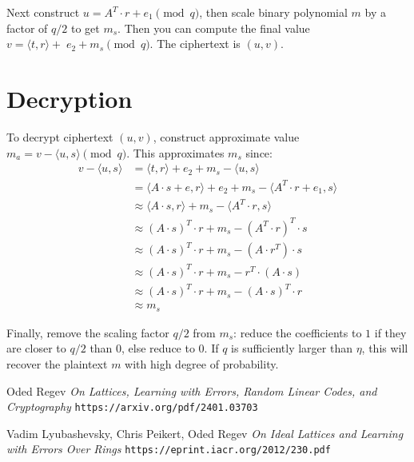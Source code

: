 \documentclass{article}
\begin{document}
Next construct $u = A^T \cdot r + e_1 \pmod{q}$, then scale binary polynomial $m$ by a factor of $q/2$ to get $m_s$.  Then you can compute the final value $v = \langle t, r \rangle +\;e_2 + m_s \pmod{q}$.  The ciphertext is $(u, v)$.

\section{
  Decryption
}

To decrypt ciphertext $(u, v)$, construct approximate value $m_a = v - \langle u, s \rangle \pmod{q}$.  This approximates $m_s$ since:
\begin{align}
  v - \langle u, s \rangle &= \langle t, r \rangle + e_2 + m_s - \langle u, s \rangle\nonumber\\
  &= \langle A \cdot s + e, r \rangle + e_2 + m_s - \langle A^T \cdot r + e_1, s \rangle\nonumber\\
  &\approx \langle A \cdot s, r \rangle + m_s - \langle A^T \cdot r, s \rangle\nonumber\\
  &\approx (A \cdot s)^T \cdot r + m_s - (A^T \cdot r)^T \cdot s\nonumber\\
  &\approx (A \cdot s)^T \cdot r + m_s - (A \cdot r^T) \cdot s\nonumber\\
  &\approx (A \cdot s)^T \cdot r + m_s - r^T \cdot (A \cdot s)\nonumber\\
  &\approx (A \cdot s)^T \cdot r + m_s - (A \cdot s)^T \cdot r\nonumber\\
  &\approx m_s
\end{align}

Finally, remove the scaling factor $q/2$ from $m_s$: reduce the coefficients to $1$ if they are closer to $q/2$ than $0$, else reduce to $0$.  If $q$ is sufficiently larger than $\eta$, this will recover the plaintext $m$ with high degree of probability.


\begin{thebibliography}{2}

  Oded Regev
  \emph{On Lattices, Learning with Errors, Random Linear Codes, and Cryptography}
  \texttt{https://arxiv.org/pdf/2401.03703}

  Vadim Lyubashevsky, Chris Peikert, Oded Regev
  \emph{On Ideal Lattices and Learning with Errors Over Rings}
  \texttt{https://eprint.iacr.org/2012/230.pdf}
  
\end{thebibliography}
\end{document}

